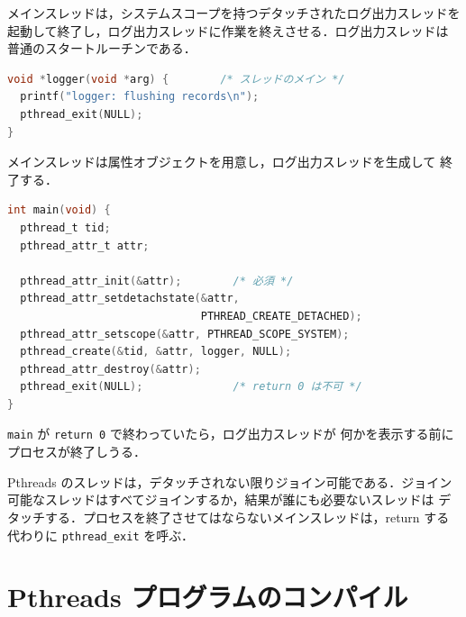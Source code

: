 \documentclass[../main.tex]{subfiles}
\begin{document}
\begin{example}
  \label{ex:l04-detached}
  メインスレッドは，システムスコープを持つデタッチされたログ出力スレッドを
  起動して終了し，ログ出力スレッドに作業を終えさせる．ログ出力スレッドは
  普通のスタートルーチンである．
  \begin{lstlisting}[language=C, numbers=none]
void *logger(void *arg) {        /* スレッドのメイン */
  printf("logger: flushing records\n");
  pthread_exit(NULL);
}
\end{lstlisting}
  メインスレッドは属性オブジェクトを用意し，ログ出力スレッドを生成して
  終了する．
  \begin{lstlisting}[language=C, numbers=none]
int main(void) {
  pthread_t tid;
  pthread_attr_t attr;

  pthread_attr_init(&attr);        /* 必須 */
  pthread_attr_setdetachstate(&attr,
                              PTHREAD_CREATE_DETACHED);
  pthread_attr_setscope(&attr, PTHREAD_SCOPE_SYSTEM);
  pthread_create(&tid, &attr, logger, NULL);
  pthread_attr_destroy(&attr);
  pthread_exit(NULL);              /* return 0 は不可 */
}
\end{lstlisting}
  \texttt{main} が \texttt{return 0} で終わっていたら，ログ出力スレッドが
  何かを表示する前にプロセスが終了しうる．
\end{example}

\begin{keypoint}
  Pthreads のスレッドは，デタッチされない限りジョイン可能である．ジョイン
  可能なスレッドはすべてジョインするか，結果が誰にも必要ないスレッドは
  デタッチする．プロセスを終了させてはならないメインスレッドは，return
  する代わりに \texttt{pthread\_exit} を呼ぶ．
\end{keypoint}

\section{Pthreads プログラムのコンパイル}
\label{sec:l04-compiling}
\end{document}
